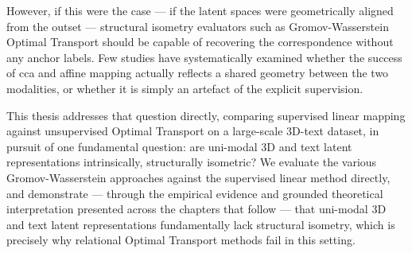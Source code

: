 However, if this were the case --- if the latent spaces were geometrically aligned from the outset --- structural isometry evaluators such as Gromov-Wasserstein Optimal Transport should be capable of recovering the correspondence without any anchor labels. Few studies have systematically examined whether the success of \gls{cca} and affine mapping actually reflects a shared geometry between the two modalities, or whether it is simply an artefact of the explicit supervision.

This thesis addresses that question directly, comparing supervised linear mapping against unsupervised Optimal Transport on a large-scale 3D-text dataset, in pursuit of one fundamental question: are uni-modal 3D and text latent representations intrinsically, structurally isometric? We evaluate the various Gromov-Wasserstein approaches against the supervised linear method directly, and demonstrate --- through the empirical evidence and grounded theoretical interpretation presented across the chapters that follow --- that uni-modal 3D and text latent representations fundamentally lack structural isometry, which is precisely why relational Optimal Transport methods fail in this setting.